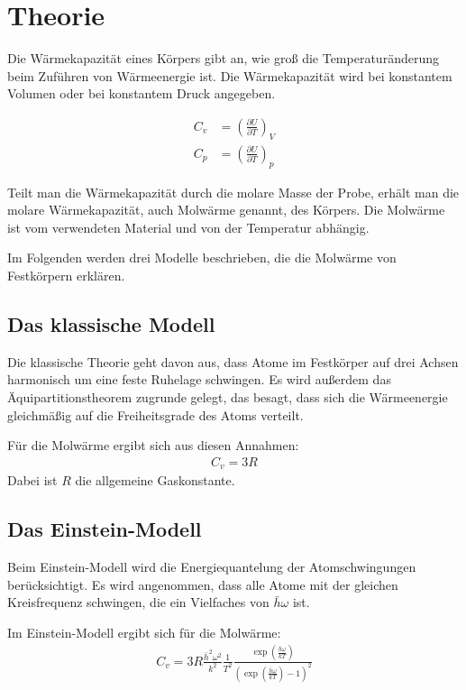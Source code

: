 \section{Theorie}

Die Wärmekapazität eines Körpers gibt an, wie groß die Temperaturänderung beim Zuführen von Wärmeenergie ist.
Die Wärmekapazität wird bei konstantem Volumen oder bei konstantem Druck angegeben.

\begin{align}
	C_v &= \left( \frac{\partial U}{\partial T} \right)_V \\
	C_p &= \left( \frac{\partial U}{\partial T} \right)_p
\end{align}

Teilt man die Wärmekapazität durch die molare Masse der Probe, erhält man die molare Wärmekapazität, auch Molwärme genannt, des Körpers.
Die Molwärme ist vom verwendeten Material und von der Temperatur abhängig.

Im Folgenden werden drei Modelle beschrieben, die die Molwärme von Festkörpern erklären.

\subsection{Das klassische Modell}
Die klassische Theorie geht davon aus, dass Atome im Festkörper auf drei Achsen harmonisch um eine feste Ruhelage schwingen.
Es wird außerdem das Äquipartitionstheorem zugrunde gelegt, das besagt, dass sich die Wärmeenergie gleichmäßig auf die Freiheitsgrade des Atoms verteilt.

Für die Molwärme ergibt sich aus diesen Annahmen:
\begin{align}
	C_v = 3R
\end{align}
Dabei ist $R$ die allgemeine Gaskonstante.

\subsection{Das Einstein-Modell}
Beim Einstein-Modell wird die Energiequantelung der Atomschwingungen berücksichtigt.
Es wird angenommen, dass alle Atome mit der gleichen Kreisfrequenz schwingen, die ein Vielfaches von $\bar{h}\omega$ ist.

Im Einstein-Modell ergibt sich für die Molwärme:
\begin{align}
	C_v = 3R \frac{\bar{h}^2 \omega^2}{k^2}\frac{1}{T^2}\frac{\exp \left(\frac{\bar{h}\omega}{k T}\right)}{\left(\exp\left(\frac{\bar{h}\omega}{k T}\right) - 1\right)^2}
\end{align}

